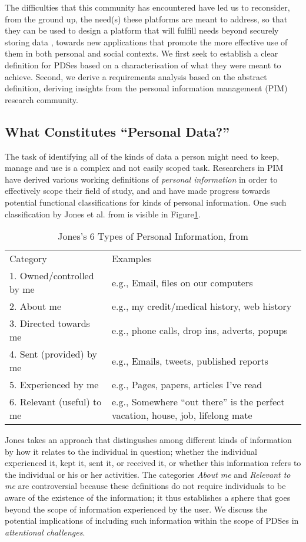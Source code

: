 \documentclass[runningheads,a4paper]{llncs}
\begin{document}
The difficulties that this community has encountered have led us to reconsider, from the ground up, the need(s) these platforms are meant to address, so that they can be used to design a platform that will fulfill needs beyond securely storing data , towards new applications that promote the more effective use of them in both personal and social contexts.  We first seek to establish a clear definition for PDSes based on a characterisation of what they were meant to achieve.  Second, we derive a requirements analysis based on the abstract definition, deriving insights from the personal information management (PIM) research community.


\subsection{What Constitutes ``Personal Data?''}

The task of identifying all of the kinds of data a person might need to keep, manage and use is a complex and not easily scoped task.  Researchers in PIM have derived various working definitions of \emph{personal information} in order to effectively scope their field of study, and and have made progress towards potential functional classifications for kinds of personal information. One such classification by Jones et al. from \cite{kftf} is visible in Figure\ref{fig:jonestype}.

\begin{table}
\begin{tabular}{p{4cm} p{8cm}} 
Category & Examples \\
1. Owned/controlled by me & e.g., Email, files on our computers  \\
2. About me	& e.g., my credit/medical history, web history \\
3. Directed towards me & e.g., phone calls, drop ins, adverts, popups \\
4. Sent (provided) by me & e.g.,  Emails, tweets, published reports  \\
5. Experienced by me & e.g.,  Pages, papers, articles I’ve read \\
6. Relevant (useful) to me	& e.g.,  Somewhere ``out there'' is the perfect vacation, house, job, lifelong mate \\
\end{tabular}
\caption{Jones's 6 Types of Personal Information, from \cite{kftf}}
\label{fig:jonestype}
\end{table}

Jones takes an approach that distingushes among different kinds of information by how it relates to the individual in question; whether the individual experienced it, kept it, sent it, or received it, or whether this information refers to the individual or his or her activities.  The categories \emph{About me} and \emph{Relevant to me} are controversial because these definitions do not require individuals to be aware of the existence of the information; it thus establishes a sphere that goes beyond the scope of information experienced by the user.  We discuss the potential implications of including such information within the scope of PDSes in \emph{attentional challenges}. 
\end{document}

